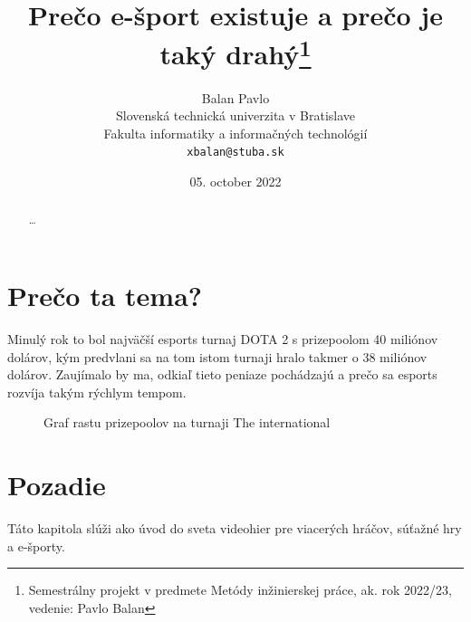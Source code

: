 \documentclass[10pt,twoside,slovak,a4paper]{article}
\title{Prečo e-šport existuje a prečo je taký drahý\thanks{Semestrálny projekt v predmete Metódy inžinierskej práce, ak. rok 2022/23, vedenie: Pavlo Balan}} %
\author{Balan Pavlo\\[2pt]
	{\small Slovenská technická univerzita v Bratislave}\\
	{\small Fakulta informatiky a informačných technológií}\\
	{\small \texttt{xbalan@stuba.sk}}
	}
\date{\small 05. october 2022} %
\begin{document}
\maketitle

\begin{abstract}
\ldots
\end{abstract}



\section{Prečo ta tema?}

Minulý rok to bol najväčší esports turnaj DOTA 2 s prizepoolom 40 miliónov dolárov, kým predvlani sa na tom istom turnaji hralo takmer o 38 miliónov dolárov. Zaujímalo by ma, odkiaľ tieto peniaze pochádzajú a prečo sa esports rozvíja takým rýchlym tempom.

\begin{figure}[h]
	\centering
	\caption{Graf rastu prizepoolov na turnaji The international}
	\label{framework}
\end{figure}

\section{Pozadie} \label{nejaka}

Táto kapitola slúži ako úvod do sveta videohier pre viacerých hráčov, súťažné hry a e-športy.
\end{document}
